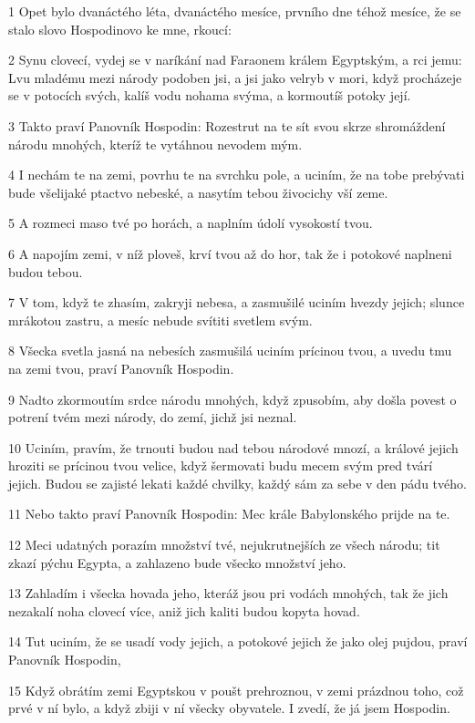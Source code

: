 \par 1 Opet bylo dvanáctého léta, dvanáctého mesíce, prvního dne téhož mesíce, že se stalo slovo Hospodinovo ke mne, rkoucí:
\par 2 Synu clovecí, vydej se v naríkání nad Faraonem králem Egyptským, a rci jemu: Lvu mladému mezi národy podoben jsi, a jsi jako velryb v mori, když procházeje se v potocích svých, kalíš vodu nohama svýma, a kormoutíš potoky její.
\par 3 Takto praví Panovník Hospodin: Rozestrut na te sít svou skrze shromáždení národu mnohých, kteríž te vytáhnou nevodem mým.
\par 4 I nechám te na zemi, povrhu te na svrchku pole, a uciním, že na tobe prebývati bude všelijaké ptactvo nebeské, a nasytím tebou živocichy vší zeme.
\par 5 A rozmeci maso tvé po horách, a naplním údolí vysokostí tvou.
\par 6 A napojím zemi, v níž ploveš, krví tvou až do hor, tak že i potokové naplneni budou tebou.
\par 7 V tom, když te zhasím, zakryji nebesa, a zasmušilé uciním hvezdy jejich; slunce mrákotou zastru, a mesíc nebude svítiti svetlem svým.
\par 8 Všecka svetla jasná na nebesích zasmušilá uciním prícinou tvou, a uvedu tmu na zemi tvou, praví Panovník Hospodin.
\par 9 Nadto zkormoutím srdce národu mnohých, když zpusobím, aby došla povest o potrení tvém mezi národy, do zemí, jichž jsi neznal.
\par 10 Uciním, pravím, že trnouti budou nad tebou národové mnozí, a králové jejich hroziti se prícinou tvou velice, když šermovati budu mecem svým pred tvárí jejich. Budou se zajisté lekati každé chvilky, každý sám za sebe v den pádu tvého.
\par 11 Nebo takto praví Panovník Hospodin: Mec krále Babylonského prijde na te.
\par 12 Meci udatných porazím množství tvé, nejukrutnejších ze všech národu; tit zkazí pýchu Egypta, a zahlazeno bude všecko množství jeho.
\par 13 Zahladím i všecka hovada jeho, kteráž jsou pri vodách mnohých, tak že jich nezakalí noha clovecí více, aniž jich kaliti budou kopyta hovad.
\par 14 Tut uciním, že se usadí vody jejich, a potokové jejich že jako olej pujdou, praví Panovník Hospodin,
\par 15 Když obrátím zemi Egyptskou v poušt prehroznou, v zemi prázdnou toho, což prvé v ní bylo, a když zbiji v ní všecky obyvatele. I zvedí, že já jsem Hospodin.
